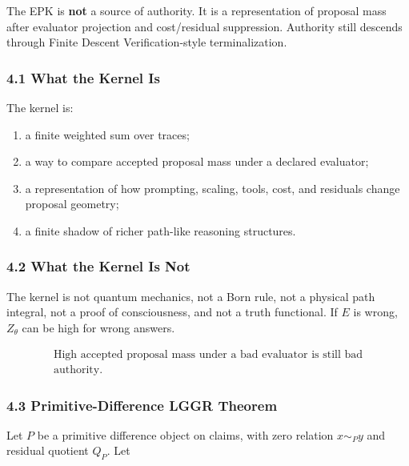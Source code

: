 \documentclass[
  10pt,
]{article}
\providecommand{\tightlist}{%
  \setlength{\itemsep}{0pt}\setlength{\parskip}{0pt}}
\providecommand{\tightlist}{%
  \setlength{\itemsep}{0pt}\setlength{\parskip}{0pt}}
\begin{document}
The EPK is \textbf{not} a source of authority. It is a representation of proposal mass after evaluator projection and cost/residual suppression. Authority still descends through Finite Descent Verification-style terminalization.

\subsubsection{4.1 What the Kernel Is}\label{what-the-kernel-is}

The kernel is:

\begin{enumerate}
\def\labelenumi{\arabic{enumi}.}
\tightlist
\item
  a finite weighted sum over traces;
\item
  a way to compare accepted proposal mass under a declared evaluator;
\item
  a representation of how prompting, scaling, tools, cost, and residuals change proposal geometry;
\item
  a finite shadow of richer path-like reasoning structures.
\end{enumerate}

\subsubsection{4.2 What the Kernel Is Not}\label{what-the-kernel-is-not}

The kernel is not quantum mechanics, not a Born rule, not a physical path integral, not a proof of consciousness, and not a truth functional. If \protect\hypertarget{math-E0028-0055}{}{\(E\)} is wrong, \protect\hypertarget{math-E0046-0056}{}{\(Z_\theta\)} can be high for wrong answers.

\protect\hypertarget{math-E0047-0057}{}{\[
\boxed{
\begin{gathered}\text{High accepted proposal mass under a bad evaluator is still bad}\\
\text{authority.}\end{gathered}
}
\]}

\subsubsection{4.3 Primitive-Difference LGGR Theorem}\label{primitive-difference-lggr-theorem}

Let \protect\hypertarget{math-E0048-0058}{}{\(P\)} be a primitive difference object on claims, with zero relation \protect\hypertarget{math-E0049-0059}{}{\(x\sim_P y\)} and residual quotient \protect\hypertarget{math-E0050-0060}{}{\(Q_P\)}. Let
\end{document}
